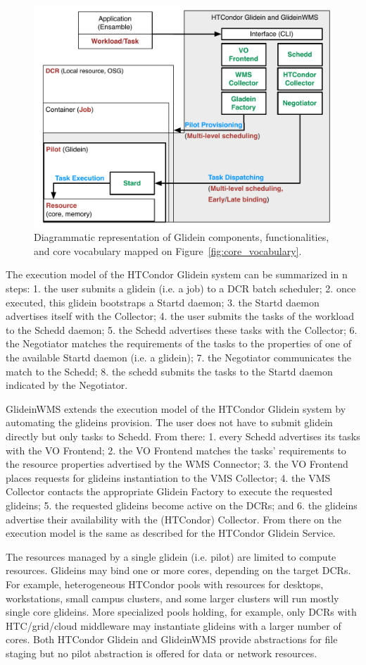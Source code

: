\documentclass{sig-alternate}
\begin{document}
\begin{figure}[t]
    \centering
        \includegraphics[width=.48\textwidth]{figures/glidein_comparison.pdf}
    \caption{Diagrammatic representation of Glidein components,
    functionalities, and core vocabulary mapped on
    Figure~\ref{fig:core_vocabulary}.}
    \label{fig:glidein_comparison}
\end{figure}

The execution model of the HTCondor Glidein system can be summarized in n
steps: 1. the user submits a glidein (i.e. a job) to a DCR batch scheduler; 2.
once executed, this glidein bootstraps a Startd daemon; 3. the Startd daemon
advertises itself with the Collector; 4. the user submits the tasks of the
workload to the Schedd daemon; 5. the Schedd advertises these tasks with the
Collector; 6. the Negotiator matches the requirements of the tasks to the
properties of one of the available Startd daemon (i.e. a glidein); 7. the
Negotiator communicates the match to the Schedd; 8. the schedd submits the tasks
to the Startd daemon indicated by the Negotiator.

GlideinWMS extends the execution model of the HTCondor Glidein system by
automating the glideins provision. The user does not have to submit glidein
directly but only tasks to Schedd. From there: 1. every Schedd advertises its
tasks with the VO Frontend; 2. the VO Frontend matches the tasks' requirements
to the resource properties advertised by the WMS Connector; 3. the VO Frontend
places requests for glideins instantiation to the VMS Collector; 4. the VMS
Collector contacts the appropriate Glidein Factory to execute the requested
glideins; 5. the requested glideins become active on the DCRs; and 6. the
glideins advertise their availability with the (HTCondor) Collector. From there
on the execution model is the same as described for the HTCondor Glidein
Service.


The resources managed by a single glidein (i.e. pilot) are limited to compute
resources. Glideins may bind one or more cores, depending on the target DCRs.
For example, heterogeneous HTCondor pools with resources for desktops,
workstations, small campus clusters, and some larger clusters will run mostly
single core glideins. More specialized pools holding, for example, only DCRs
with HTC/grid/cloud middleware may instantiate glideins with a larger number of
cores. Both HTCondor Glidein and GlideinWMS provide abstractions for file
staging but no pilot abstraction is offered for data or network resources.
\end{document}
